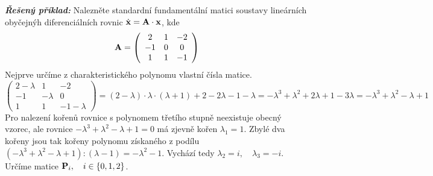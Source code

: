 {\it\bf Řešený příklad:}\newline %
Nalezněte standardní fundamentální matici soustavy lineárních obyčejnýh diferenciálních rovnic $\dot{\bf x}={\bf A}\cdot {\bf x}$, kde
\begin{equation*}
 {\bf A} = \left(\begin{array}{ccc}
                  2 & 1 & -2\\ -1 & 0 & 0\\ 1 & 1 & -1
                 \end{array}\right)
\end{equation*}
Nejprve určíme z charakteristického polynomu vlastní čísla matice.
\begin{equation*}
 \left(\begin{array}{ccc}
          2 - \lambda & 1 & -2\\
	  -1 & -\lambda & 0\\
	  1 & 1 & -1 - \lambda
       \end{array}\right)
 = (2 - \lambda)\cdot \lambda \cdot(\lambda + 1) + 2 - 2 \lambda - 1 - \lambda = - \lambda^3 + \lambda^2 + 2\lambda + 1 - 3\lambda = -\lambda^3 + \lambda^2 - \lambda + 1
\end{equation*}
Pro nalezení kořenů rovnice s polynomem třetího stupně neexistuje obecný vzorec, ale rovnice $-\lambda^3 + \lambda^2 - \lambda + 1 = 0$ má zjevně kořen $\lambda_1 = 1$. Zbylé dva kořeny jsou tak kořeny polynomu získaného z podílu $(-\lambda^3 + \lambda^2 - \lambda + 1):(\lambda - 1) = -\lambda^2 - 1$. Vychází tedy $\lambda_2 = i,\quad \lambda_3 = -i$.
Určíme matice ${\bf P}_i,\quad i \in \{0,1,2\}$.
